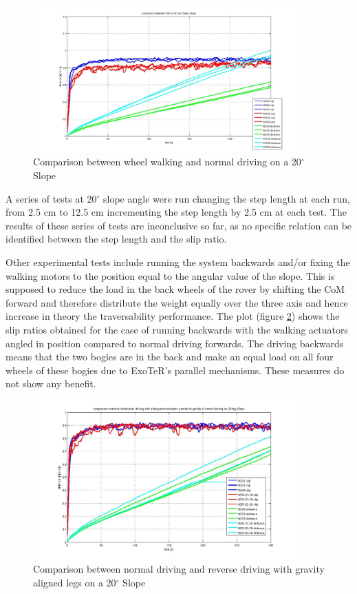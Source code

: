 \documentclass[a4paper,twocolumn]{esapub2005} %
\begin{document}
\begin{figure}[h!]
	\centering		\includegraphics[width=0.9\textwidth]{20d.JPG}	
	\caption{Comparison between wheel walking and normal driving on a 20$^{\circ}$ Slope}
	\label{fig:20d}
\end{figure}



A series of tests at 20$^{\circ}$ slope angle were run changing the step length at each run, from 2.5 cm to 12.5 cm incrementing the step length by 2.5 cm at each test. The results of these series of tests are inconclusive so far, as no specific relation can be identified between the step length and the slip ratio.

Other experimental tests include running the system backwards and/or fixing the walking motors to the position equal to the angular value of the slope. This is supposed to reduce the load in the back wheels of the rover by shifting the CoM forward and therefore distribute the weight equally over the three axis and hence increase in theory the traversability performance. The plot (figure \ref{fig:ndr20d}) shows the slip ratios obtained for the case of running backwards with the walking actuators angled in position compared to normal driving forwards. The driving backwards means that the two bogies are in the back and make an equal load on all four wheels of these bogies due to ExoTeR's parallel mechanisms.
These measures do not show any benefit.


\begin{figure}[h!]
	\centering		\includegraphics[width=0.9\textwidth]{ndr20d.JPG}	
	\caption{Comparison between normal driving and reverse driving with gravity aligned legs on a 20$^{\circ}$ Slope}
	\label{fig:ndr20d}
\end{figure}
\end{document}
